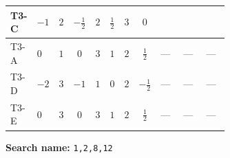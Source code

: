 \documentclass[8pt]{article}
\begin{document}
\begin{landscape}
\begin{longtable}{@{}llcccccc >{\raggedright\arraybackslash}p{0.21\linewidth} >{\raggedright\arraybackslash}p{0.21\linewidth} >{\raggedright\arraybackslash}p{0.21\linewidth}@{}}
T3-C & $-1$ & $2$ & $-\frac{1}{2}$ & $2$ & $\frac{1}{2}$ & $3$ & $0$ & \scriptsize\adjustbox{max width=\linewidth}{$\begin{gathered} \frac{lambda12Inv2 \overline{y_{1}} \overline{y_{2}}}{6 MF}\end{gathered}$} & \scriptsize\adjustbox{max width=\linewidth}{$\begin{gathered} \frac{\sqrt{3} g_{2}^{2} \overline{y_{1}} \overline{y_{2}}}{8 MF}\end{gathered}$} & \scriptsize\adjustbox{max width=\linewidth}{$\begin{gathered} - \frac{\sqrt{3} ye \overline{y_{1}} \overline{y_{2}} \overline{ye}}{24 MF}\end{gathered}$} \\
\midrule
T3-A & $0$ & $1$ & $0$ & $3$ & $1$ & $2$ & $\frac{1}{2}$ & --- & --- & --- \\
\midrule
T3-D & $-2$ & $3$ & $-1$ & $1$ & $0$ & $2$ & $-\frac{1}{2}$ & --- & --- & --- \\
\midrule
T3-E & $0$ & $3$ & $0$ & $3$ & $1$ & $2$ & $\frac{1}{2}$ & --- & --- & --- \\
\midrule
\bottomrule
\end{longtable}
\clearpage
\noindent\textbf{Search name: }\texttt{1,2,8,12}\par\smallskip

\end{landscape}
\end{document}

